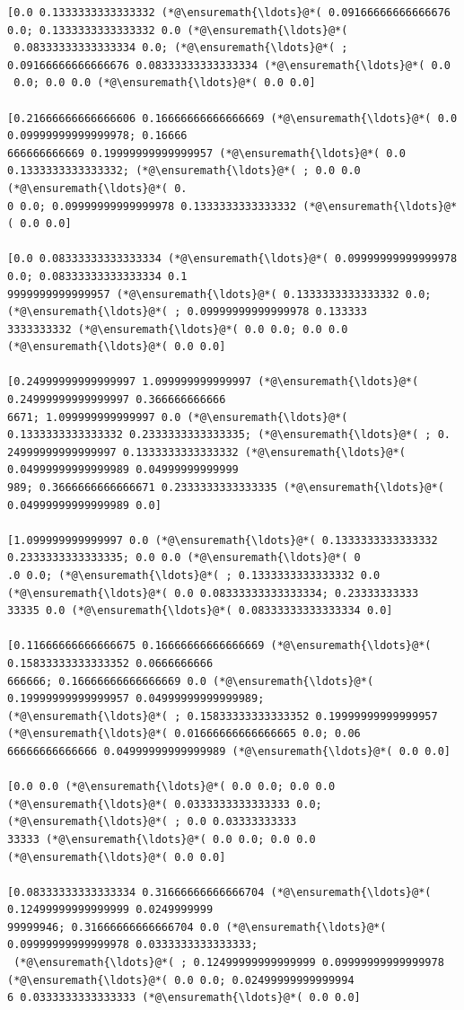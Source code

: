 \documentclass[12pt,a4paper]{article}
\begin{document}
\begin{lstlisting}
[0.0 0.1333333333333332 (*@\ensuremath{\ldots}@*( 0.09166666666666676 0.0; 0.1333333333333332 0.0 (*@\ensuremath{\ldots}@*(
 0.08333333333333334 0.0; (*@\ensuremath{\ldots}@*( ; 0.09166666666666676 0.08333333333333334 (*@\ensuremath{\ldots}@*( 0.0
 0.0; 0.0 0.0 (*@\ensuremath{\ldots}@*( 0.0 0.0]

[0.21666666666666606 0.16666666666666669 (*@\ensuremath{\ldots}@*( 0.0 0.09999999999999978; 0.16666
666666666669 0.19999999999999957 (*@\ensuremath{\ldots}@*( 0.0 0.1333333333333332; (*@\ensuremath{\ldots}@*( ; 0.0 0.0 (*@\ensuremath{\ldots}@*( 0.
0 0.0; 0.09999999999999978 0.1333333333333332 (*@\ensuremath{\ldots}@*( 0.0 0.0]

[0.0 0.08333333333333334 (*@\ensuremath{\ldots}@*( 0.09999999999999978 0.0; 0.08333333333333334 0.1
9999999999999957 (*@\ensuremath{\ldots}@*( 0.1333333333333332 0.0; (*@\ensuremath{\ldots}@*( ; 0.09999999999999978 0.133333
3333333332 (*@\ensuremath{\ldots}@*( 0.0 0.0; 0.0 0.0 (*@\ensuremath{\ldots}@*( 0.0 0.0]

[0.24999999999999997 1.099999999999997 (*@\ensuremath{\ldots}@*( 0.24999999999999997 0.366666666666
6671; 1.099999999999997 0.0 (*@\ensuremath{\ldots}@*( 0.1333333333333332 0.2333333333333335; (*@\ensuremath{\ldots}@*( ; 0.
24999999999999997 0.1333333333333332 (*@\ensuremath{\ldots}@*( 0.04999999999999989 0.04999999999999
989; 0.3666666666666671 0.2333333333333335 (*@\ensuremath{\ldots}@*( 0.04999999999999989 0.0]

[1.099999999999997 0.0 (*@\ensuremath{\ldots}@*( 0.1333333333333332 0.2333333333333335; 0.0 0.0 (*@\ensuremath{\ldots}@*( 0
.0 0.0; (*@\ensuremath{\ldots}@*( ; 0.1333333333333332 0.0 (*@\ensuremath{\ldots}@*( 0.0 0.08333333333333334; 0.23333333333
33335 0.0 (*@\ensuremath{\ldots}@*( 0.08333333333333334 0.0]

[0.11666666666666675 0.16666666666666669 (*@\ensuremath{\ldots}@*( 0.15833333333333352 0.0666666666
666666; 0.16666666666666669 0.0 (*@\ensuremath{\ldots}@*( 0.19999999999999957 0.04999999999999989; 
(*@\ensuremath{\ldots}@*( ; 0.15833333333333352 0.19999999999999957 (*@\ensuremath{\ldots}@*( 0.01666666666666665 0.0; 0.06
66666666666666 0.04999999999999989 (*@\ensuremath{\ldots}@*( 0.0 0.0]

[0.0 0.0 (*@\ensuremath{\ldots}@*( 0.0 0.0; 0.0 0.0 (*@\ensuremath{\ldots}@*( 0.0333333333333333 0.0; (*@\ensuremath{\ldots}@*( ; 0.0 0.03333333333
33333 (*@\ensuremath{\ldots}@*( 0.0 0.0; 0.0 0.0 (*@\ensuremath{\ldots}@*( 0.0 0.0]

[0.08333333333333334 0.31666666666666704 (*@\ensuremath{\ldots}@*( 0.12499999999999999 0.0249999999
99999946; 0.31666666666666704 0.0 (*@\ensuremath{\ldots}@*( 0.09999999999999978 0.0333333333333333;
 (*@\ensuremath{\ldots}@*( ; 0.12499999999999999 0.09999999999999978 (*@\ensuremath{\ldots}@*( 0.0 0.0; 0.02499999999999994
6 0.0333333333333333 (*@\ensuremath{\ldots}@*( 0.0 0.0]


\end{lstlisting}
\end{document}
